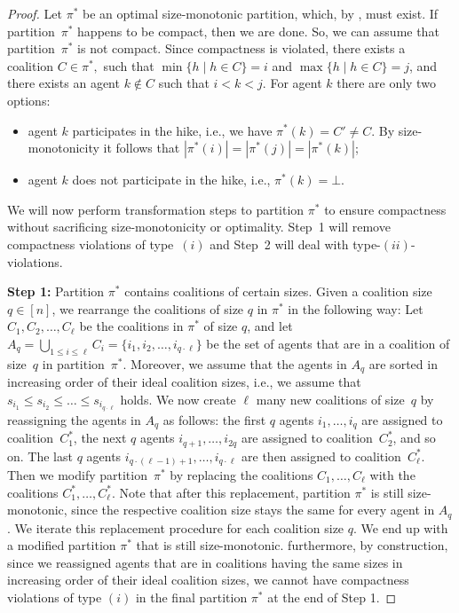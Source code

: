 \documentclass[a4paper,UKenglish,cleveref, autoref, thm-restate]{lipics-v2021}
\newcommand{\set}[1]{\{#1\}}
\begin{document}
\begin{proof}
Let $\pi^*$ be an optimal size-monotonic partition, which, by , must exist. If partition~$\pi^*$ happens to be compact, then we are done. So, we can assume that partition~$\pi^*$ is not compact. Since compactness is violated, there exists a coalition $C\in \pi^*,$ such that $\min\set{h \mid h \in C}=i$ and $\max\set{h \mid h\in C}=j$, and there exists an agent $k\not\in C$ such that $i<k<j$. For agent $k$ there are only two options:
\begin{itemize}
\item[(i)] agent $k$ participates in the hike, i.e., we have $\pi^*(k) = C' \neq C$. By size-monotonicity it follows that $|\pi^*(i)| = |\pi^*(j)| = |\pi^*(k)|$; 
\item[(ii)] agent $k$ does not participate in the hike, i.e., $\pi^*(k) = \bot$.
\end{itemize}
We will now perform transformation steps to partition $\pi^*$ to ensure compactness without sacrificing size-monotonicity or optimality. Step~1 will remove compactness violations of type~$(i)$ and Step~2 will deal with type-$(ii)$-violations.

\textbf{Step 1:} Partition $\pi^*$ contains coalitions of certain sizes.
Given a coalition size $q\in [n]$, we rearrange the coalitions of size $q$ in $\pi^*$ in the following way:
Let $C_1,C_2,\dots,C_\ell$ be the coalitions in $\pi^*$ 
of size $q$,
and let $A_q = \bigcup_{1\leq i \leq \ell}C_i = \{i_1,i_2,\dots,i_{q\cdot\ell}\}$ be the set of agents that are in a coalition of size~$q$ in partition~$\pi^*$. Moreover, we assume that the agents in $A_q$ are sorted in increasing order of their ideal coalition sizes, i.e., we assume that  $s_{i_1} \leq s_{i_2} \leq \dots \leq s_{i_{q\cdot\ell}}$ holds. We now create $\ell$ many new coalitions of size~$q$ by reassigning the agents in $A_q$ as follows: the first $q$ agents $i_1,\dots,i_q$ are assigned to coalition~$C_1^*$, the next $q$ agents $i_{q+1},\dots,i_{2q}$ are assigned to coalition~$C_2^*$, and so on. The last $q$ agents $i_{q\cdot(\ell-1)+1}, \dots, i_{q\cdot\ell}$ are then assigned to coalition~$C_\ell^*$. Then we modify partition~$\pi^*$ by replacing the coalitions $C_1,\dots,C_\ell$ with the coalitions $C_1^*,\dots,C_\ell^*$. Note that after this replacement, partition $\pi^*$ is still size-monotonic, since the respective coalition size stays the same for every agent in $A_q$. 
We iterate this replacement procedure for 
each coalition size $q$.
We end up with a modified partition $\pi^*$ that is still size-monotonic. furthermore, by construction,  since we reassigned agents that are in coalitions having the same sizes in increasing order of their ideal coalition sizes, we cannot have compactness violations of type $(i)$ in the final partition $\pi^*$ at the end of Step 1.   


\end{proof}
\end{document}

